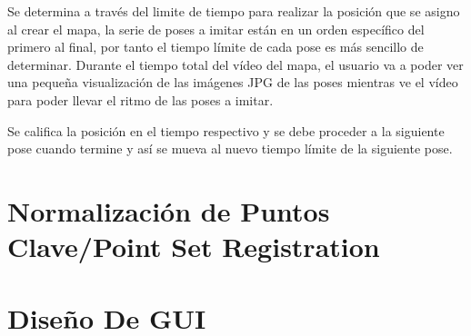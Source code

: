 Se determina a través del limite de tiempo para realizar la posición que se asigno al crear el mapa, la serie de poses a imitar están en un orden específico del primero al final, por tanto el tiempo límite de cada pose es más sencillo de determinar. Durante el tiempo total del vídeo del mapa, el usuario va a poder ver una pequeña visualización de las imágenes JPG de las poses mientras ve el vídeo para poder llevar el ritmo de las poses a imitar.

Se califica la posición en el tiempo respectivo y se debe proceder a la siguiente pose cuando termine y así se mueva al nuevo tiempo límite de la siguiente pose.


\section{Normalización de Puntos Clave/Point Set Registration}


 





\section{Diseño De GUI}

